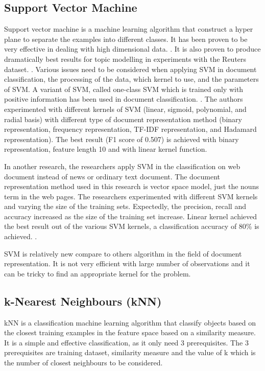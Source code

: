 \subsection{Support Vector Machine}
Support vector machine is a machine learning algorithm that construct a hyper plane to separate the examples into different classes. It has been proven to be very effective in dealing with high dimensional data. \cite{webSvm}. It is also proven to produce dramatically best results for topic modelling in experiments with the Reuters dataset. \cite{inductiveText}. Various issues need to be considered when applying SVM in document classification, the processing of the data, which kernel to use, and the parameters of SVM. A variant of SVM, called one-class SVM which is trained only with positive information has been used in document classification. \cite{oneSvm}.  The authors experimented with different kernels of SVM (linear, sigmoid, polynomial, and radial basis) with different type of document representation method (binary representation, frequency representation, TF-IDF representation, and Hadamard representation). The best result (F1 score of 0.507) is achieved with binary representation, feature length 10 and with linear kernel function.  
	
In another research, the researchers apply SVM in the classification on web document instead of news or ordinary text document. The document representation method used in this research is vector space model, just the nouns term in the web pages. The researchers experimented with different SVM kernels and varying the size of the training sets. Expectedly, the precision, recall and accuracy increased as the size of the training set increase. Linear kernel achieved the best result out of the various SVM kernels, a classification accuracy of 80\% is achieved. \cite{webSvm}.
	
SVM is relatively new compare to others algorithm in the field of document representation. It is not very efficient with large number of observations and it can be tricky to find an appropriate kernel for the problem. 
	
\subsection{k-Nearest Neighbours (kNN)}
kNN is a classification machine learning algorithm that classify objects based on the closest training examples in the feature space based on a similarity measure. It is a simple and effective classification, as it only need 3 prerequisites. The 3 prerequisites are training dataset, similarity measure and the value of k which is the number of closest neighbours to be considered. 
	
